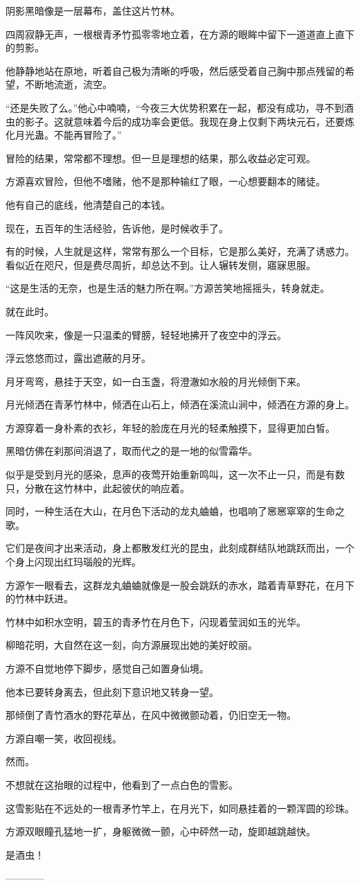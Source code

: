 \begin{this_body}
阴影黑暗像是一层幕布，盖住这片竹林。

四周寂静无声，一根根青矛竹孤零零地立着，在方源的眼眸中留下一道道直上直下的剪影。

他静静地站在原地，听着自己极为清晰的呼吸，然后感受着自己胸中那点残留的希望，不断地流逝，流空。

“还是失败了么。”他心中喃喃，“今夜三大优势积累在一起，都没有成功，寻不到酒虫的影子。这就意味着今后的成功率会更低。我现在身上仅剩下两块元石，还要炼化月光蛊。不能再冒险了。”

冒险的结果，常常都不理想。但一旦是理想的结果，那么收益必定可观。

方源喜欢冒险，但他不嗜赌，他不是那种输红了眼，一心想要翻本的赌徒。

他有自己的底线，他清楚自己的本钱。

现在，五百年的生活经验，告诉他，是时候收手了。

有的时候，人生就是这样，常常有那么一个目标，它是那么美好，充满了诱惑力。看似近在咫尺，但是费尽周折，却总达不到。让人辗转发侧，寤寐思服。

“这是生活的无奈，也是生活的魅力所在啊。”方源苦笑地摇摇头，转身就走。

就在此时。

一阵风吹来，像是一只温柔的臂膀，轻轻地拂开了夜空中的浮云。

浮云悠悠而过，露出遮蔽的月牙。

月牙弯弯，悬挂于天空，如一白玉盏，将澄澈如水般的月光倾倒下来。

月光倾洒在青茅竹林中，倾洒在山石上，倾洒在溪流山涧中，倾洒在方源的身上。

方源穿着一身朴素的衣衫，年轻的脸庞在月光的轻柔触摸下，显得更加白皙。

黑暗仿佛在刹那间消退了，取而代之的是一地的似雪霜华。

似乎是受到月光的感染，息声的夜莺开始重新鸣叫，这一次不止一只，而是有数只，分散在这竹林中，此起彼伏的响应着。

同时，一种生活在大山，在月色下活动的龙丸蛐蛐，也唱响了窸窸窣窣的生命之歌。

它们是夜间才出来活动，身上都散发红光的昆虫，此刻成群结队地跳跃而出，一个个身上闪现出红玛瑙般的光辉。

方源乍一眼看去，这群龙丸蛐蛐就像是一股会跳跃的赤水，踏着青草野花，在月下的竹林中跃进。

竹林中如积水空明，碧玉的青矛竹在月色下，闪现着莹润如玉的光华。

柳暗花明，大自然在这一刻，向方源展现出她的美好皎丽。

方源不自觉地停下脚步，感觉自己如置身仙境。

他本已要转身离去，但此刻下意识地又转身一望。

那倾倒了青竹酒水的野花草丛，在风中微微颤动着，仍旧空无一物。

方源自嘲一笑，收回视线。

然而。

不想就在这抬眼的过程中，他看到了一点白色的雪影。

这雪影贴在不远处的一根青矛竹竿上，在月光下，如同悬挂着的一颗浑圆的珍珠。

方源双眼瞳孔猛地一扩，身躯微微一颤，心中砰然一动，旋即越跳越快。

是酒虫！

------------

\end{this_body}

